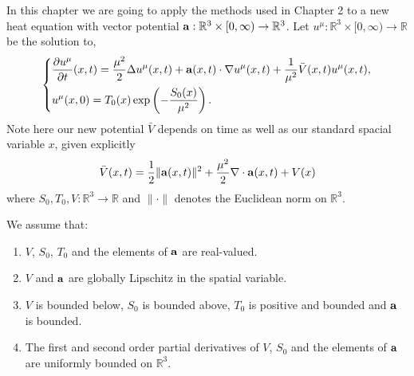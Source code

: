 \documentclass[a4paper,12pt,draft]{report}
\theoremstyle{remark}
\theoremstyle{definition}
\begin{document}
In this chapter we are going to apply the methods used in Chapter 2 to a new heat equation with vector potential $\bold{a} : \mathbb{R}^3 \times [0, \infty) \to \mathbb{R}^3$.  Let $u^\mu : \mathbb{R}^3 \times [0, \infty) \to \mathbb{R}$ be the solution to,
\begin{equation}
\left\{
\begin{aligned}
& \frac{\partial u^\mu}{\partial t}(x, t) = \frac{\mu^2}{2}\Delta u^\mu(x, t) + \bold{a}(x, t)\cdot\nabla u^\mu(x, t) + \frac{1}{\mu^2}\bar{V}(x, t)u^\mu(x, t),\\ \label{VPHE}
& u^\mu(x, 0) = T_0(x)\exp\left(-\frac{S_0(x)}{\mu^2}\right).
\end{aligned}
\right.
\end{equation}
Note here our new potential $\bar{V}$ depends on time as well as our standard spacial variable $x$, given explicitly
$$
\bar{V}(x, t) = \frac{1}{2}\|\bold{a}(x, t)\|^2 + \frac{\mu^2}{2}\nabla\cdot\bold{a}(x, t) + V(x)
$$
where $S_{0}, T_{0}, V:\mathbb{R}^3  \to \mathbb{R}$ and $\|\cdot\|$ denotes the Euclidean norm on $\mathbb{R}^3$.
\assume
{
We assume that:
\begin{enumerate}
\item $V$, $S_0$, $T_0$ and the elements of $\bold{a}$ are real-valued.
\item $V$ and $\bold{a}$ are globally Lipschitz in the spatial variable.
\item $V$ is bounded below, $S_0$ is bounded above, $T_0$ is positive and bounded and $\bold{a}$ is bounded.
\item The first and second order partial derivatives of $V$, $S_0$ and the elements of $\bold{a}$ are uniformly bounded on $\mathbb{R}^3$.
\end{enumerate}
}
\end{document}
